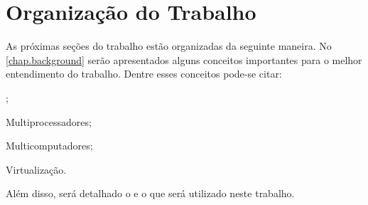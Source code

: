\section{Organização do Trabalho}
\label{sec.organization}

As próximas seções do trabalho estão organizadas da seguinte maneira. No \autoref{chap.background} serão apresentados alguns conceitos importantes para o melhor entendimento do trabalho. Dentre esses conceitos pode-se citar:
\begin{inlinelist}[label= (\roman*)]
    \item \Lws;
    \item Multiprocessadores;
    \item Multicomputadores;
    \item Virtualização.
\end{inlinelist}
Além disso, será detalhado o \os e o \lw que será utilizado neste trabalho.